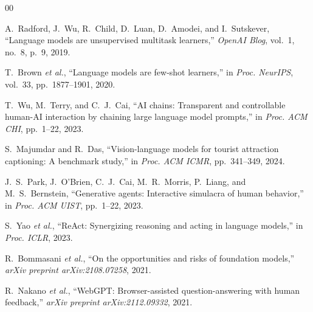 \documentclass[conference]{IEEEtran}
\begin{document}
\begin{thebibliography}{00}

A.~Radford, J.~Wu, R.~Child, D.~Luan, D.~Amodei, and I.~Sutskever,
``Language models are unsupervised multitask learners,''
\emph{OpenAI Blog}, vol.~1, no.~8, p.~9, 2019.

T.~Brown \emph{et al.},
``Language models are few-shot learners,''
in \emph{Proc. NeurIPS}, vol.~33, pp.~1877--1901, 2020.

T.~Wu, M.~Terry, and C.~J.~Cai,
``AI chains: Transparent and controllable human-AI interaction by chaining
large language model prompts,''
in \emph{Proc. ACM CHI}, pp.~1--22, 2023.

S.~Majumdar and R.~Das,
``Vision-language models for tourist attraction captioning: A benchmark study,''
in \emph{Proc. ACM ICMR}, pp.~341--349, 2024.

J.~S.~Park, J.~O'Brien, C.~J.~Cai, M.~R.~Morris, P.~Liang, and M.~S.~Bernstein,
``Generative agents: Interactive simulacra of human behavior,''
in \emph{Proc. ACM UIST}, pp.~1--22, 2023.

S.~Yao \emph{et al.},
``ReAct: Synergizing reasoning and acting in language models,''
in \emph{Proc. ICLR}, 2023.

R.~Bommasani \emph{et al.},
``On the opportunities and risks of foundation models,''
\emph{arXiv preprint arXiv:2108.07258}, 2021.

R.~Nakano \emph{et al.},
``WebGPT: Browser-assisted question-answering with human feedback,''
\emph{arXiv preprint arXiv:2112.09332}, 2021.

\end{thebibliography}

\balance
\end{document}
